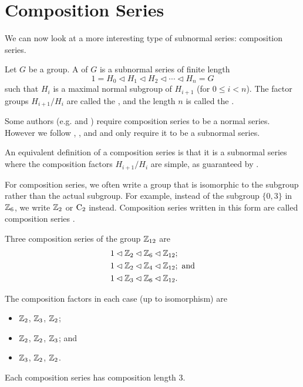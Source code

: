 \section{Composition Series}
We can now look at a more interesting type of subnormal series: composition series.

\newpage

\begin{definition}
    Let $G$ be a group. A  of $G$ is a subnormal series of finite length
    \[
        1 = H_0 \lhd H_1 \lhd H_2 \lhd \cdots \lhd H_n = G
    \]
    such that $H_i$ is a maximal normal subgroup of $H_{i+1}$ (for $0 \leq i < n$). The factor groups $H_{i+1}/H_i$ are called the , and the length $n$ is called the .
\end{definition}
\begin{remark}
    Some authors (e.g. {\cite[p.~257]{cohn_1982}} and {\cite[\S 73]{clark_1984}}) require composition series to be a normal series. However we follow {\cite[Definition II.8.3]{hungerford_1980}}, {\cite[Definition 15.12]{humphreys_1996}}, and {\cite[p.~85]{milne_2021}} and only require it to be a subnormal series.
\end{remark}
\begin{remark}
    An equivalent definition of a composition series is that it is a subnormal series where the composition factors $H_{i+1}/H_i$ are simple, as guaranteed by .
\end{remark}

For composition series, we often write a group that is isomorphic to the subgroup rather than the actual subgroup. For example, instead of the subgroup $\{0, 3\}$ in $\mathbb{Z}_6$, we write $\mathbb{Z}_2$ or $\mathrm{C}_{2}$ instead. Composition series written in this form are called composition series .

\begin{example}
    Three composition series of the group $\mathbb{Z}_{12}$ are
    \begin{align*}
        &1 \lhd \mathbb{Z}_2 \lhd \mathbb{Z}_6 \lhd \mathbb{Z}_{12};\\
        &1 \lhd \mathbb{Z}_2 \lhd \mathbb{Z}_4 \lhd \mathbb{Z}_{12}; \text{ and}\\
        &1 \lhd \mathbb{Z}_3 \lhd \mathbb{Z}_6 \lhd \mathbb{Z}_{12}.
    \end{align*}

    The composition factors in each case (up to isomorphism) are
    \begin{itemize}
        \item $\mathbb{Z}_2$, $\mathbb{Z}_3$, $\mathbb{Z}_2$;
        \item $\mathbb{Z}_2$, $\mathbb{Z}_2$, $\mathbb{Z}_3$; and
        \item $\mathbb{Z}_3$, $\mathbb{Z}_2$, $\mathbb{Z}_2$.
    \end{itemize}
    Each composition series has composition length 3.
\end{example}

